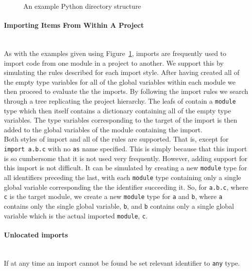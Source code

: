 \documentclass[12pt, titlepage]{article}
\begin{document}
\begin{figure}
\caption{An example Python directory structure}
\label{fig:directory}
\end{figure}


\paragraph*{Importing Items From Within A Project}\mbox{}\\
As with the examples given using Figure~\ref{fig:directory}, imports are frequently used to import code from one module in a project to another. We support this by simulating the rules described for each import style. After having created all of the empty type variables for all of the global variables within each module we then proceed to evaluate the the imports. By following the import rules we search through a tree replicating the project hierarchy. The leafs of contain a \texttt{module} type which then itself contains a dictionary containing all of the empty type variables. The type variables corresponding to the target of the import is then added to the global variables of the module containing the import. \\
\indent Both styles of import and all of the rules are supported. That is, except for \texttt{import a.b.c} with no \texttt{as} name specified. This is simply because that this import is so cumbersome that it is not used very frequently. However, adding support for this import is not difficult. It can be simulated by creating a new \texttt{module} type for all identifiers preceding the last, with each \texttt{module} type containing only a single global variable corresponding the the identifier succeeding it. So, for \texttt{a.b.c}, where \texttt{c} is the target module, we create a new \texttt{module} type for \texttt{a} and \texttt{b}, where \texttt{a} contains only the single global variable, \texttt{b}, and \texttt{b} contains only a single global variable which is the actual imported \texttt{module}, \texttt{c}.


\paragraph*{Unlocated imports}\mbox{} \\
If at any time an import cannot be found be set relevant identifier to \texttt{any} type.
\end{document}
